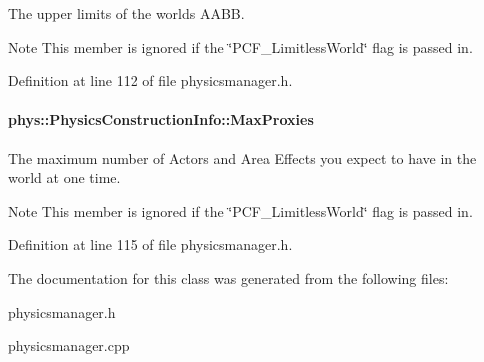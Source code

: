 The upper limits of the worlds AABB. 

\begin{DoxyNote}{Note}
This member is ignored if the \char`\"{}PCF\_\-LimitlessWorld\char`\"{} flag is passed in. 
\end{DoxyNote}


Definition at line 112 of file physicsmanager.h.

\hypertarget{classphys_1_1PhysicsConstructionInfo_aae25b797d7ea11b812bc3433c38f554a}{
\paragraph[{MaxProxies}]{ {\bf phys::PhysicsConstructionInfo::MaxProxies}}\hfill}
\label{classphys_1_1PhysicsConstructionInfo_aae25b797d7ea11b812bc3433c38f554a}


The maximum number of Actors and Area Effects you expect to have in the world at one time. 

\begin{DoxyNote}{Note}
This member is ignored if the \char`\"{}PCF\_\-LimitlessWorld\char`\"{} flag is passed in. 
\end{DoxyNote}


Definition at line 115 of file physicsmanager.h.



The documentation for this class was generated from the following files:\begin{DoxyCompactItemize}
\item 
physicsmanager.h\item 
physicsmanager.cpp\end{DoxyCompactItemize}
